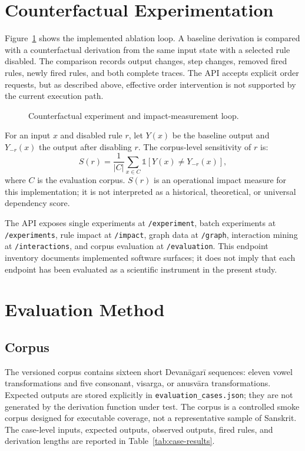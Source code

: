 \documentclass[conference]{IEEEtran}
\newcommand{\code}[1]{\texttt{#1}}
\begin{document}
\section{Counterfactual Experimentation}
Figure~\ref{fig:experiment} shows the implemented ablation loop. A baseline derivation is compared with a counterfactual derivation from the same input state with a selected rule disabled. The comparison records output changes, step changes, removed fired rules, newly fired rules, and both complete traces. The API accepts explicit order requests, but as described above, effective order intervention is not supported by the current execution path.

\begin{figure}[t]
  \centering
  
  \caption{Counterfactual experiment and impact-measurement loop.}
  \label{fig:experiment}
\end{figure}

For an input $x$ and disabled rule $r$, let $Y(x)$ be the baseline output and $Y_{-r}(x)$ the output after disabling $r$. The corpus-level sensitivity of $r$ is:
\begin{equation}
  S(r) = \frac{1}{|C|}\sum_{x\in C} \mathbb{1}[Y(x) \neq Y_{-r}(x)],
\end{equation}
where $C$ is the evaluation corpus. $S(r)$ is an operational impact measure for this implementation; it is not interpreted as a historical, theoretical, or universal dependency score.

The API exposes single experiments at \code{/experiment}, batch experiments at \code{/experiments}, rule impact at \code{/impact}, graph data at \code{/graph}, interaction mining at \code{/interactions}, and corpus evaluation at \code{/evaluation}. This endpoint inventory documents implemented software surfaces; it does not imply that each endpoint has been evaluated as a scientific instrument in the present study.

\section{Evaluation Method}
\subsection{Corpus}
The versioned corpus contains sixteen short Devan\=agar\=i sequences: eleven vowel transformations and five consonant, visarga, or anusv\=ara transformations. Expected outputs are stored explicitly in \code{evaluation\_cases.json}; they are not generated by the derivation function under test. The corpus is a controlled smoke corpus designed for executable coverage, not a representative sample of Sanskrit. The case-level inputs, expected outputs, observed outputs, fired rules, and derivation lengths are reported in Table~\ref{tab:case-results}.
\end{document}
